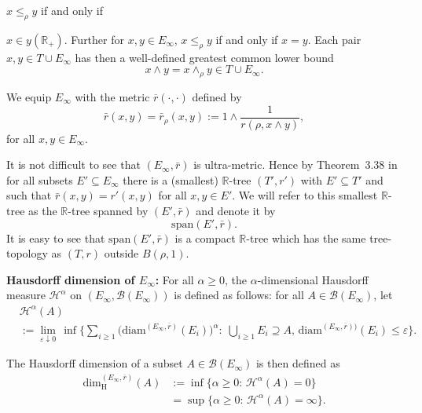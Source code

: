 \documentclass[11pt]{amsart}
\numberwithin{equation}{section}
\begin{document}
$x\le_\rho y$ if and only if {$x\in y({{\mathbb R}}_+)$. Further for $x,y \in E_{\infty}$, $x\le_\rho y$ if and only if $x=y.$ Each pair $x,y\in T\cup E_\infty$ has then a well-defined {{\it} greatest common lower bound}
\begin{equation}
\label{brach}
   x\wedge y
 =
   x\wedge_\rho y\in T\cup E_\infty.
\end{equation}

We equip $E_\infty$ with the metric $\overline r(\boldsymbol{\cdot},\boldsymbol{\cdot})$ defined by
\begin{equation}\label{e:barr}
   \bar{r}(x,y)=\bar{r}_\rho(x,y)
 :=
   1\wedge \frac{1}{r(\rho,x\wedge y)},
\end{equation}
for all $x,y\in E_\infty$.

It is not difficult to see that $(E_\infty,\bar{r})$ is ultra-metric.
Hence by Theorem~3.38 in \cite{Eva} for all subsets $E'\subseteq E_\infty$ there is a (smallest) ${{\mathbb R}}$-tree $(T',r')$ with $E'\subseteq T'$ and such that $\bar{r}(x,y)=r'(x,y)$ for all $x,y\in E'$. We will refer to this smallest ${{\mathbb R}}$-tree as the ${{\mathbb R}}$-tree {{\it} spanned by $(E',\bar{r})$} and denote it by \begin{equation}
\label{e:023}
   \mathrm{span}(E',\bar{r}).
\end{equation} {\smallskip}
It is easy to see that $\mathrm{span}(E',\bar{r})$  is a  compact ${{\mathbb R}}$-tree which has the same tree-topology as $(T,r)$ {outside $B(\rho,1)$}.
\medskip

{\bf  Hausdorff dimension of $E_{\infty}$: }
 For all $\alpha\ge 0$,
the {{\it} $\alpha$-dimensional Hausdorff measure} ${\mathcal H}^\alpha$ on $(E_\infty,{\mathcal B}(E_\infty))$ is defined as follows:
for all $A\in{\mathcal B}(E_{\infty})$, let
\begin{equation}\label{e:inha}
\begin{aligned}
   &{\mathcal H}^\alpha(A)
   \\
 &:=
   \lim_{\varepsilon\downarrow 0}\,
   \inf\big\{\sum_{i\ge 1}\big(\mathrm{diam}^{(E_{\infty}, \overline r)}(E_i)\big)^\alpha:\;
   \bigcup_{i\ge 1}E_i\supseteq A,\,\mathrm{diam}^{(E_{\infty}, \overline r))}(E_i)\le\varepsilon\big\}.
\end{aligned}
\end{equation}

The {{\it} Hausdorff dimension} of a subset $A\in{\mathcal B}(E_{\infty})$ is then defined as
\begin{equation}\label{dim}
\begin{aligned}
   \mathrm{dim}_{\mathrm{H}}^{(E_{\infty},\overline r)}(A)
 &:=
   \inf\big\{\alpha\ge 0:\,{\mathcal H}^\alpha(A)=0\big\}
  \\
 &=
   \sup\big\{\alpha\ge 0:\,{\mathcal H}^\alpha(A)=\infty\big\}.
\end{aligned}
\end{equation}

}
\end{document}
